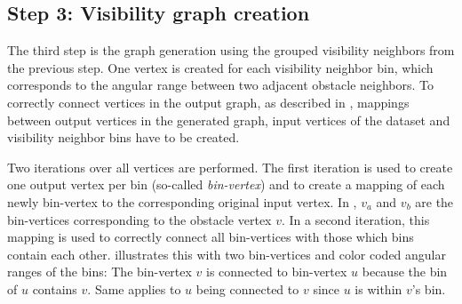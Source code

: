 	\subsection{Step 3: Visibility graph creation}
	\label{subsec:step-3-graph-creation}
	
		The third step is the graph generation using the grouped visibility neighbors from the previous step.
		One vertex is created for each visibility neighbor bin, which corresponds to the angular range between two adjacent obstacle neighbors.
		To correctly connect vertices in the output graph, as described in , mappings between output vertices in the generated graph, input vertices of the dataset and visibility neighbor bins have to be created.
		
		Two iterations over all vertices are performed.
		The first iteration is used to create one output vertex per bin (so-called \emph{bin-vertex}) and to create a mapping of each newly bin-vertex to the corresponding original input vertex.
		In , $v_a$ and $v_b$ are the bin-vertices corresponding to the obstacle vertex $v$.
		In a second iteration, this mapping is used to correctly connect all bin-vertices with those which bins contain each other.
		 illustrates this with two bin-vertices and color coded angular ranges of the bins:
		The bin-vertex $v$ is connected to bin-vertex $u$ because the bin of $u$ contains $v$.
		Same applies to $u$ being connected to $v$ since $u$ is within $v$'s bin.
		
